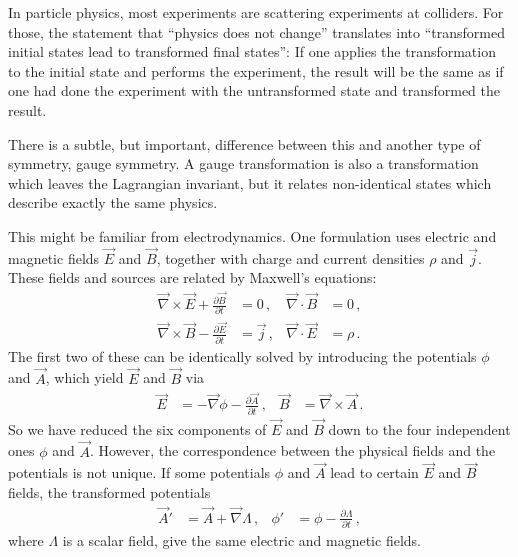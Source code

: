 \documentclass[12pt]{report}
\newcommand{\2}{\ensuremath{\sqrt{2}\,}}
\begin{document}
{      In particle physics, most experiments are scattering experiments at colliders. For those, the
      statement that ``physics does not change'' translates into ``transformed initial states lead
      to transformed final states'': If one applies the transformation to the initial state and
      performs the experiment, the result will be the same as if one had done the experiment with
      the untransformed state and transformed the result.
          
      There is a subtle, but important, difference between this and another type of symmetry,
      gauge symmetry.  A gauge transformation is also a transformation which leaves the Lagrangian
      invariant, but it relates non-identical states which describe exactly the same
      physics.
      
      This might be familiar from electrodynamics. One formulation uses electric and magnetic
      fields $\vec{E}$ and $\vec{B}$, together with charge and current densities $\rho$ and
      $\vec{j}$. These fields and sources are related by Maxwell's equations:
      \begin{subequations}
        \begin{align}
          \vec{\nabla} \times \vec{E} + \frac{\partial \vec{B}}{\partial t} &=0 \,, & \vec{\nabla}\cdot
          \vec{B}&=0\,,\\ 
          \vec{\nabla} \times \vec{B} - \frac{\partial \vec{E}}{\partial t} &=\vec{j}\,,
          &\vec{\nabla}\cdot\vec{E} &=\rho\,.
        \end{align}
      \end{subequations}
      The first two of these can be identically solved by introducing the potentials $\phi$
      and $\vec{A}$, which yield $\vec{E}$ and $\vec{B}$ via
      \begin{align}\label{eq:gt}
        \vec{E}&= -\vec{\nabla} \phi -\frac{\partial\vec{A}}{\partial t}\,, & \vec{B}
        &=\vec{\nabla}\times\vec{A}\,.
      \end{align}
      So we have reduced the six components of $\vec{E}$ and $\vec{B}$ down to the four independent
      ones $\phi$ and $\vec{A}$. However, the correspondence between the physical fields and
      the potentials is not unique. If some potentials $\phi$ and $\vec{A}$ lead to
      certain $\vec{E}$ and $\vec{B}$ fields, the transformed potentials
      \begin{align}\label{eq:maxwellgaugetrafo}
        \vec{A}'&= \vec{A} +\vec{\nabla} \Lambda\,, & \phi'& = \phi- \frac{\partial\Lambda}{\partial t}\,,
      \end{align}
      where $\Lambda$ is a scalar field, give the same electric and magnetic fields.
      
}
\end{document}
